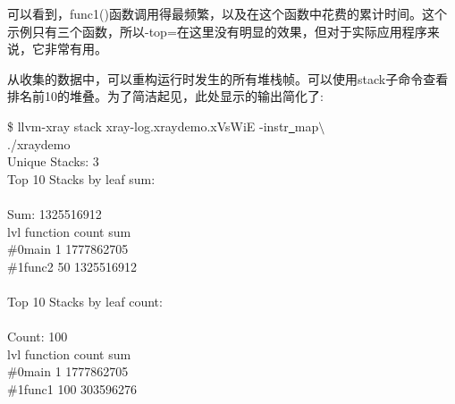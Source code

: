 可以看到，func1()函数调用得最频繁，以及在这个函数中花费的累计时间。这个示例只有三个函数，所以-top=在这里没有明显的效果，但对于实际应用程序来说，它非常有用。\par

从收集的数据中，可以重构运行时发生的所有堆栈帧。可以使用stack子命令查看排名前10的堆叠。为了简洁起见，此处显示的输出简化了:\par

\begin{tcolorbox}[colback=white,colframe=black]
\$ llvm-xray stack xray-log.xraydemo.xVsWiE -instr\underline{~}map$\setminus$ \\
\hspace*{0.5cm}./xraydemo \\
Unique Stacks: 3 \\
Top 10 Stacks by leaf sum:\\
\\
Sum: 1325516912\\
lvl \hspace{1cm}function \hspace{2.5cm}count \hspace{2.5cm}sum\\
\#0\hspace{1.5cm}main \hspace{3.3cm}1 \hspace{1.3cm}1777862705 \\
\#1\hspace{1.5cm}func2 \hspace{3.0cm}50 \hspace{1.35cm}1325516912 \\
\\
Top 10 Stacks by leaf count:\\
\\
Count: 100 \\
lvl \hspace{1cm}function \hspace{2.5cm}count \hspace{2.5cm}sum \\
\#0\hspace{1.5cm}main \hspace{3.3cm}1 \hspace{1.3cm}1777862705 \\
\#1\hspace{1.5cm}func1 \hspace{2.9cm}100 \hspace{1.45cm}303596276
\end{tcolorbox}


